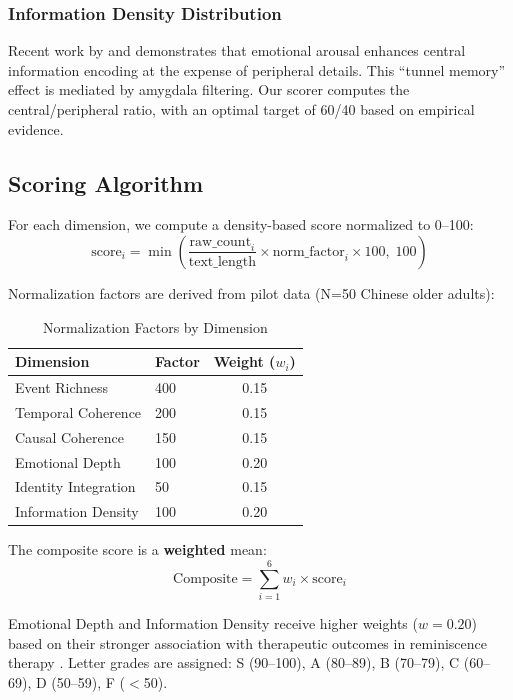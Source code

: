 \documentclass[11pt]{article}
\begin{document}
\subsubsection{Information Density Distribution}

Recent work by \citet{kensinger2026} and \citet{picard2025} demonstrates that emotional arousal enhances central information encoding at the expense of peripheral details. This ``tunnel memory'' effect is mediated by amygdala filtering. Our scorer computes the central/peripheral ratio, with an optimal target of 60/40 based on empirical evidence.

\subsection{Scoring Algorithm}

For each dimension, we compute a density-based score normalized to 0--100:
\begin{equation}
\text{score}_i = \min\left(\frac{\text{raw\_count}_i}{\text{text\_length}} \times \text{norm\_factor}_i \times 100,\; 100\right)
\end{equation}

Normalization factors are derived from pilot data (N=50 Chinese older adults):

\begin{table}[h]
\centering
\caption{Normalization Factors by Dimension}
\label{tab:normalization}
\begin{tabular}{llc}
\toprule
\textbf{Dimension} & \textbf{Factor} & \textbf{Weight ($w_i$)} \\
\midrule
Event Richness & 400 & 0.15 \\
Temporal Coherence & 200 & 0.15 \\
Causal Coherence & 150 & 0.15 \\
Emotional Depth & 100 & 0.20 \\
Identity Integration & 50 & 0.15 \\
Information Density & 100 & 0.20 \\
\bottomrule
\end{tabular}
\end{table}

The composite score is a \textbf{weighted} mean:
\begin{equation}
\text{Composite} = \sum_{i=1}^{6} w_i \times \text{score}_i
\end{equation}

Emotional Depth and Information Density receive higher weights ($w = 0.20$) based on their stronger association with therapeutic outcomes in reminiscence therapy \citep{westerhof2024, kensinger2026}. Letter grades are assigned: S (90--100), A (80--89), B (70--79), C (60--69), D (50--59), F ($<$50).
\end{document}
